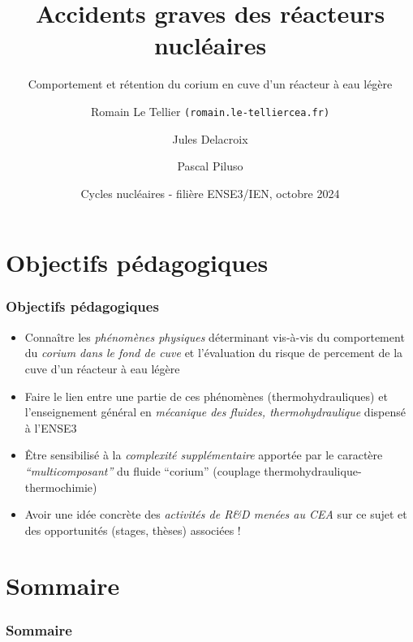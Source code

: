 \documentclass[usenames,dvipsnames,aspectratio=169, 10pt]{beamer}
\title[Rétention du corium en cuve]  %
{Accidents graves des réacteurs nucléaires}
\subtitle{Comportement et rétention du corium en cuve d'un réacteur à eau légère}
\date[Octobre 2024]  %
{Cycles nucléaires - filière ENSE3/IEN, octobre 2024}
\author[Romain Le Tellier]  %
{Romain Le Tellier \texttt{(\small romain.le-tellier\myat cea.fr)} \and Jules Delacroix \and Pascal Piluso}
\institute[CEA IRESNE]  %
{CEA, DES, IRESNE, DTN, Cadarache}
\renewcommand{\emph}[1]{\textcolor{ceared}{\textit{#1}}}
\begin{document}
\begin{frame}[decorated] %
  \titlepage
\end{frame}

\section{Objectifs pédagogiques}
\begin{frame}[fragile]
\frametitle{Objectifs pédagogiques}
\begin{itemize}
\item Connaître les \emph{phénomènes physiques} déterminant vis-à-vis du comportement du \emph{corium dans le fond de cuve} et l'évaluation du risque de percement de la cuve d'un réacteur à eau légère
\item Faire le lien entre une partie de ces phénomènes (thermohydrauliques) et l'enseignement général en \emph{mécanique des fluides, thermohydraulique} dispensé à l'ENSE3
\item Être sensibilisé à la \emph{complexité supplémentaire} apportée par le caractère \emph{``multicomposant''} du fluide ``corium'' (couplage thermohydraulique-thermochimie)
\item Avoir une idée concrète des \emph{activités de R\&D menées au CEA} sur ce sujet et des opportunités (stages, thèses) associées !
\end{itemize}
\end{frame}

\section*{Sommaire}
\begin{frame}[fragile]
\frametitle{Sommaire}
  \linespread{0.9}
  \tableofcontents[sectionstyle=hide/show, subsectionstyle=hide/show/show,sections={2-}, firstsection=2]
  \linespread{1}
\end{frame}



\end{document}

